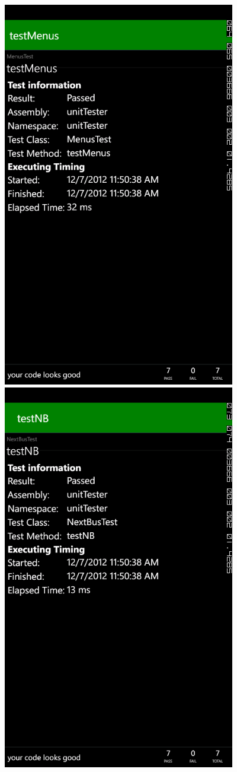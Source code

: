 \documentclass[pdftex,12pt,letter]{article}
\begin{document}
\FloatBarrier
\includegraphics[width=4in]{ss8.png}
\FloatBarrier
\includegraphics[width=4in]{ss9.png}
\FloatBarrier
\end{document}
